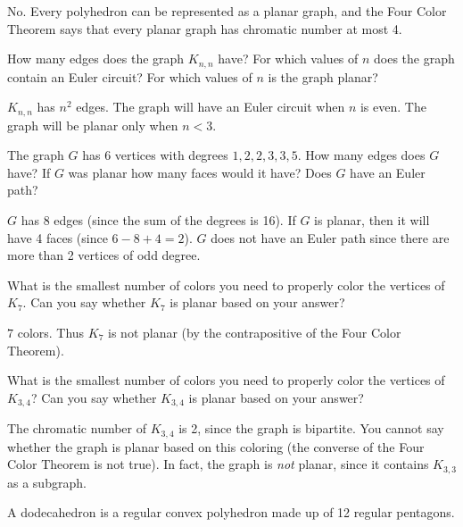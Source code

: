 \begin{questions}
	 \begin{answer}
		 No.  Every polyhedron can be represented as a planar graph, and the Four Color Theorem says that every planar graph has chromatic number at most 4.
	 \end{answer} 
 
 
 \question How many edges does the graph $K_{n,n}$ have?  For which values of $n$ does the graph contain an Euler circuit?  For which values of $n$ is the graph planar?

  \begin{answer}
  $K_{n,n}$ has $n^2$ edges.  The graph will have an Euler circuit when $n$ is even.  The graph will be planar only when $n < 3$.
  \end{answer}
 
 
 
 \question The graph $G$ has 6 vertices with degrees $1, 2, 2, 3, 3, 5$.  How many edges does $G$ have?  If $G$ was planar how many faces would it have?  Does $G$ have an Euler path?

  \begin{answer}
  $G$ has 8 edges (since the sum of the degrees is 16).  If $G$ is planar, then it will have 4 faces (since $6 - 8 + 4 = 2$).  $G$ does not have an Euler path since there are more than 2 vertices of odd degree.
  \end{answer}
 

  
\question What is the smallest number of colors you need to properly color the vertices of $K_{7}$.  Can you say whether $K_7$ is planar based on your answer?

  \begin{answer}
  $7$ colors.  Thus $K_7$ is not planar (by the contrapositive of the Four Color Theorem).
  \end{answer}


\question What is the smallest number of colors you need to properly color the vertices of $K_{3,4}$?  Can you say whether $K_{3,4}$ is planar based on your answer?

  \begin{answer}
  The chromatic number of $K_{3,4}$ is 2, since the graph is bipartite.  You cannot say whether the graph is planar based on this coloring (the converse of the Four Color Theorem is not true).  In fact, the graph is {\em not} planar, since it contains $K_{3,3}$ as a subgraph.
  \end{answer}


\question A dodecahedron is a regular convex polyhedron made up of 12 regular pentagons.  
\begin{parts}

\end{parts}
\end{questions}
